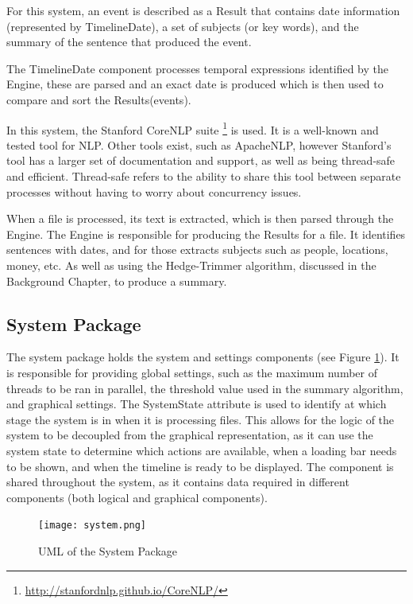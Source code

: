 \par For this system, an event is described as a Result that contains date information (represented by TimelineDate), a set of subjects (or key words), and the summary of the sentence that produced the event.
\par The TimelineDate component processes temporal expressions identified by the Engine, these are parsed and an exact date is produced which is then used to compare and sort the Results(events).
\par In this system, the Stanford CoreNLP suite \footnote{\url{http://stanfordnlp.github.io/CoreNLP/}} is used. It is a well-known and tested tool for NLP. Other tools exist, such as ApacheNLP, however Stanford's tool has a larger set of documentation and support, as well as being thread-safe and efficient. Thread-safe refers to the ability to share this tool between separate processes without having to worry about concurrency issues. 
\par When a file is processed, its text is extracted, which is then parsed through the Engine. The Engine is responsible for producing the Results for a file. It identifies sentences with dates, and for those extracts subjects such as people, locations, money, etc. As well as using the Hedge-Trimmer algorithm, discussed in the Background Chapter, to produce a summary.

\subsection{System Package}
\par The system package holds the system and settings components (see Figure \ref{fig:system}). It is responsible for providing global settings, such as the maximum number of threads to be ran in parallel, the threshold value used in the summary algorithm, and graphical settings. The SystemState attribute is used to identify at which stage the system is in when it is processing files. This allows for the logic of the system to be decoupled from the graphical representation, as it can use the system state to determine which actions are available, when a loading bar needs to be shown, and when the timeline is ready to be displayed. The component is shared throughout the system, as it contains data required in different components (both logical and graphical components).
\begin{figure}[H]
\caption{UML of the System Package}
\label{fig:system}
\texttt{[image: system.png]}
\centering
\end{figure}

